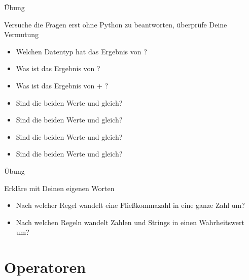 	
	\begin{frame}{Übung}
		
		\begin{block}{Versuche die Fragen erst ohne Python zu beantworten, überprüfe Deine Vermutung}
			\begin{itemize}
				\item Welchen Datentyp hat das Ergebnis von  ?
				\item Was ist das Ergebnis von  ? 
				\item Was ist das Ergebnis von \py{"2"} + ? 
				\item Sind die beiden Werte  und  gleich? 
				\item Sind die beiden Werte  und  gleich? 
				\item Sind die beiden Werte  und  gleich? 
				\item Sind die beiden Werte  und  gleich? 
			\end{itemize}
		\end{block}
		
		
	\end{frame}

	\begin{frame}{Übung}
	
	\begin{block}{Erkläre mit Deinen eigenen Worten}
		\begin{itemize}
			\item Nach welcher Regel wandelt  eine Fließkommazahl in eine ganze Zahl um? 
			\item Nach welchen Regeln wandelt  Zahlen und Strings in einen Wahrheitswert um? 
		\end{itemize}
	\end{block}
	
	
\end{frame}




\section{Operatoren}

